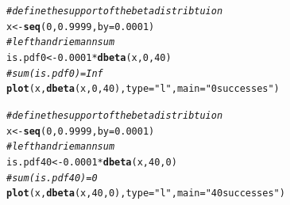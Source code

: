 \documentclass[12pt]{article}\usepackage[]{graphicx}\usepackage[]{color}
\makeatletter
\newcommand{\hlnum}[1]{\textcolor[rgb]{0.686,0.059,0.569}{#1}}%
\newcommand{\hlstr}[1]{\textcolor[rgb]{0.192,0.494,0.8}{#1}}%
\newcommand{\hlcom}[1]{\textcolor[rgb]{0.678,0.584,0.686}{\textit{#1}}}%
\newcommand{\hlopt}[1]{\textcolor[rgb]{0,0,0}{#1}}%
\newcommand{\hlstd}[1]{\textcolor[rgb]{0.345,0.345,0.345}{#1}}%
\newcommand{\hlkwb}[1]{\textcolor[rgb]{0.69,0.353,0.396}{#1}}%
\newcommand{\hlkwc}[1]{\textcolor[rgb]{0.333,0.667,0.333}{#1}}%
\newcommand{\hlkwd}[1]{\textcolor[rgb]{0.737,0.353,0.396}{\textbf{#1}}}%
\newenvironment{kframe}{%
 \def\at@end@of@kframe{}%
 \ifinner\ifhmode%
  \def\at@end@of@kframe{\end{minipage}}%
  \begin{minipage}{\columnwidth}%
 \fi\fi%
 \def\FrameCommand##1{\hskip\@totalleftmargin \hskip-\fboxsep
 \colorbox{shadecolor}{##1}\hskip-\fboxsep
     \hskip-\linewidth \hskip-\@totalleftmargin \hskip\columnwidth}%
 \MakeFramed {\advance\hsize-\width
   \@totalleftmargin\z@ \linewidth\hsize
   \@setminipage}}%
 {\par\unskip\endMakeFramed%
 \at@end@of@kframe}
\newenvironment{knitrout}{}{} %
\makeatother
\begin{document}
\begin{knitrout}\footnotesize
{}\color{fgcolor}\begin{kframe}
\begin{alltt}
\hlcom{#define the support of the beta distribtuion}
\hlstd{x} \hlkwb{<-} \hlkwd{seq}\hlstd{(}\hlnum{0}\hlstd{,} \hlnum{0.9999}\hlstd{,} \hlkwc{by}\hlstd{=}\hlnum{0.0001}\hlstd{)}
\hlcom{#left hand riemann sum}
\hlstd{is.pdf0} \hlkwb{<-} \hlnum{0.0001}\hlopt{*}\hlkwd{dbeta}\hlstd{(x,} \hlnum{0}\hlstd{,} \hlnum{40}\hlstd{)}
\hlcom{#sum(is.pdf0)=Inf}
\hlkwd{plot}\hlstd{(x,} \hlkwd{dbeta}\hlstd{(x,} \hlnum{0}\hlstd{,} \hlnum{40}\hlstd{),} \hlkwc{type}\hlstd{=}\hlstr{"l"}\hlstd{,} \hlkwc{main}\hlstd{=}\hlstr{"0 successes"}\hlstd{)}

\hlcom{#define the support of the beta distribtuion}
\hlstd{x} \hlkwb{<-} \hlkwd{seq}\hlstd{(}\hlnum{0}\hlstd{,} \hlnum{0.9999}\hlstd{,} \hlkwc{by}\hlstd{=}\hlnum{0.0001}\hlstd{)}
\hlcom{#left hand riemann sum}
\hlstd{is.pdf40} \hlkwb{<-} \hlnum{0.0001}\hlopt{*}\hlkwd{dbeta}\hlstd{(x,} \hlnum{40}\hlstd{,} \hlnum{0}\hlstd{)}
\hlcom{#sum(is.pdf40)=0}
\hlkwd{plot}\hlstd{(x,} \hlkwd{dbeta}\hlstd{(x,} \hlnum{40}\hlstd{,} \hlnum{0}\hlstd{),} \hlkwc{type}\hlstd{=}\hlstr{"l"}\hlstd{,} \hlkwc{main}\hlstd{=}\hlstr{"40 successes"}\hlstd{)}
\end{alltt}
\end{kframe}
\end{knitrout}
\end{document}
